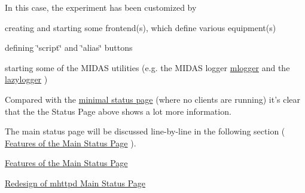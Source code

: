 In this case, the experiment has been customized by
\begin{DoxyItemize}
\item creating and starting some frontend(s), which define various equipment(s)
\item defining \char`\"{}script\char`\"{} and \char`\"{}alias\char`\"{} buttons
\item starting some of the MIDAS utilities (e.g. the MIDAS logger \hyperlink{F_Logging_F_mlogger_utility}{mlogger} and the \hyperlink{F_LogUtil_F_lazylogger_utility}{lazylogger} )
\end{DoxyItemize}

Compared with the \hyperlink{RC_mhttpd_utility_RC_mhttpd_minimal_status_page}{minimal status page} (where no clients are running) it's clear that the the Status Page above shows a lot more information.

The main status page will be discussed line-\/by-\/line in the following section ( \hyperlink{RC_mhttpd_status_page_features}{Features of the Main Status Page} ).


\begin{DoxyItemize}
\item \hyperlink{RC_mhttpd_status_page_features}{Features of the Main Status Page}
\item \hyperlink{RC_mhttpd_status_page_redesign}{Redesign of mhttpd Main Status Page}
\end{DoxyItemize}



\label{index_end}
\hypertarget{index_end}{}
